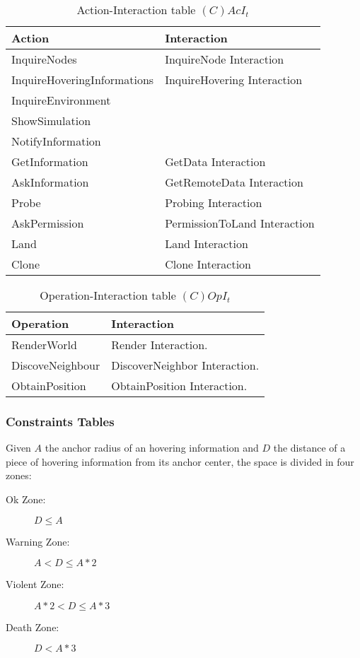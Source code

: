 \begin{table}[H]
	\centering
	\begin{tabular}{|p{5cm}|p{7cm}|}
			\hline
			\textbf{Action} & \textbf{Interaction} \\
      \hline
      InquireNodes & InquireNode Interaction \\
      \hline
      InquireHoveringInformations & InquireHovering Interaction\\
      \hline
      InquireEnvironment & \\
      \hline
      ShowSimulation & \\
      \hline
      NotifyInformation & \\
      \hline
      GetInformation &  GetData Interaction\\
      \hline
      AskInformation & GetRemoteData Interaction\\
      \hline
      Probe & Probing Interaction \\
      \hline
      AskPermission & PermissionToLand Interaction \\
      \hline
      Land & Land Interaction\\
      \hline
      Clone & Clone Interaction\\
      \hline
		\end{tabular}
	\caption{Action-Interaction table $(C)AcI_t$}
	\label{tab:cacit}
\end{table}

\begin{table}[H]
	\centering
	\begin{tabular}{|p{4cm}|p{8cm}|}
			\hline
			\textbf{Operation} & \textbf{Interaction} \\
			\hline
			RenderWorld & Render Interaction. \\
			\hline
			DiscoveNeighbour & DiscoverNeighbor Interaction. \\
			\hline
			ObtainPosition & ObtainPosition Interaction.  \\
			\hline
		\end{tabular}
	\caption{Operation-Interaction table $(C)OpI_t$}
	\label{tab:opit}
\end{table}

\subsubsection{Constraints Tables}

Given $A$ the anchor radius of an hovering information and $D$ the distance of
a piece of hovering information from its anchor center, the space is divided in four zones:
\begin{description}
  \item[Ok Zone:] $D \leq A$
  \item[Warning Zone:] $A < D \leq A*2$
  \item[Violent Zone:] $A*2 < D \leq A*3$
  \item[Death Zone:] $D < A*3$
\end{description}

